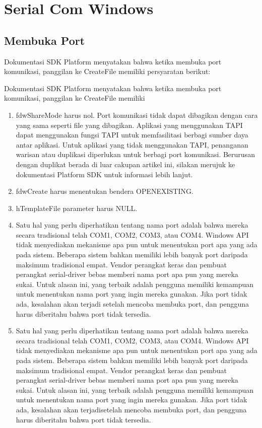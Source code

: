 \section{Serial Com Windows}
	\subsection{Membuka Port}

		Dokumentasi SDK Platform menyatakan bahwa ketika membuka port komunikasi, panggilan ke CreateFile memiliki persyaratan berikut:

	Dokumentasi SDK Platform menyatakan bahwa ketika membuka port komunikasi, panggilan ke CreateFile memiliki 

		\begin{enumerate} 
			Dokumentasi SDK Platform menyatakan bahwa ketika membuka port komunikasi, panggilan ke CreateFile memiliki persyaratan berikut:
				\item  fdwShareMode harus nol. Port komunikasi tidak dapat dibagikan dengan cara yang sama seperti file yang dibagikan. Aplikasi yang menggunakan TAPI dapat menggunakan fungsi TAPI untuk memfasilitasi berbagi sumber daya antar aplikasi. Untuk aplikasi yang tidak menggunakan TAPI, penanganan warisan atau duplikasi diperlukan untuk berbagi port komunikasi. Berurusan dengan duplikat berada di luar cakupan artikel ini, silakan merujuk ke dokumentasi Platform SDK untuk informasi lebih lanjut.
				\item  fdwCreate harus menentukan bendera OPENEXISTING.
				\item  hTemplateFile parameter harus NULL.

			\item Satu hal yang perlu diperhatikan tentang nama port adalah bahwa mereka secara tradisional telah COM1, COM2, COM3, atau COM4. Windows API tidak menyediakan mekanisme apa pun untuk menentukan port apa yang ada pada sistem. Beberapa sistem bahkan memiliki lebih banyak port daripada maksimum tradisional empat. Vendor perangkat keras dan pembuat perangkat serial-driver bebas memberi nama port apa pun yang mereka sukai. Untuk alasan ini, yang terbaik adalah pengguna memiliki kemampuan untuk menentukan nama port yang ingin mereka gunakan. Jika port tidak ada, kesalahan akan terjadi setelah mencoba membuka port, dan pengguna harus diberitahu bahwa port tidak tersedia.

			\item Satu hal yang perlu diperhatikan tentang nama port adalah bahwa mereka secara tradisional telah COM1, COM2, COM3, atau COM4. Windows API tidak menyediakan mekanisme apa pun untuk menentukan port apa yang ada pada sistem. Beberapa sistem bahkan memiliki lebih banyak port daripada maksimum tradisional empat. Vendor perangkat keras dan pembuat perangkat serial-driver bebas memberi nama port apa pun yang mereka sukai. Untuk alasan ini, yang terbaik adalah pengguna memiliki kemampuan untuk menentukan nama port yang ingin mereka gunakan. Jika port tidak ada, kesalahan akan terjadisetelah mencoba membuka port, dan pengguna harus diberitahu bahwa port tidak tersedia.

		\end{enumerate}
